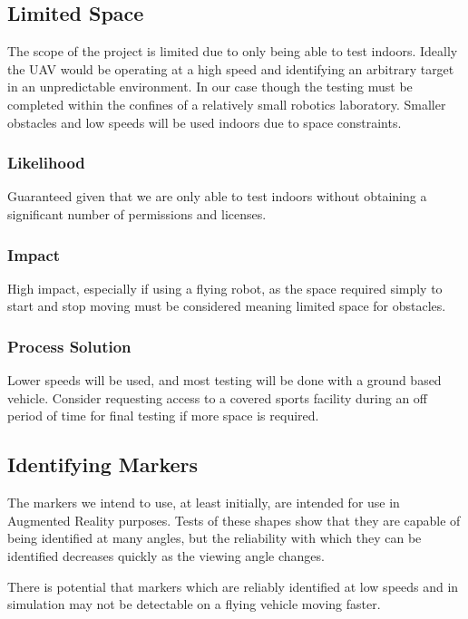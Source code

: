 \documentclass{article}
\begin{document}
	\subsection{Limited Space}
	The scope of the project is limited due to only being able to test indoors. Ideally the UAV would be operating at a high speed and identifying an arbitrary target in an unpredictable environment. In our case though the testing must be completed within the confines of a relatively small robotics laboratory. Smaller obstacles and low speeds will be used indoors due to space constraints. 

	\subsubsection{Likelihood}
	
	Guaranteed given that we are only able to test indoors without obtaining a significant number of permissions and licenses. 
	
	\subsubsection{Impact}
	
	High impact, especially if using a flying robot, as the space required simply to start and stop moving must be considered meaning limited space for obstacles.
	
	\subsubsection{Process Solution}
	
	Lower speeds will be used, and most testing will be done with a ground based vehicle. Consider requesting access to a covered sports facility during an off period of time for final testing if more space is required.
	
	\subsection{Identifying Markers}
	
	The markers we intend to use, at least initially, are intended for use in Augmented Reality purposes. Tests of these shapes show that they are capable of being identified at many angles, but the reliability with which they can be identified decreases quickly as the viewing angle changes. 
	
	There is potential that markers which are reliably identified at low speeds and in simulation may not be detectable on a flying vehicle moving faster.
	
\end{document}
